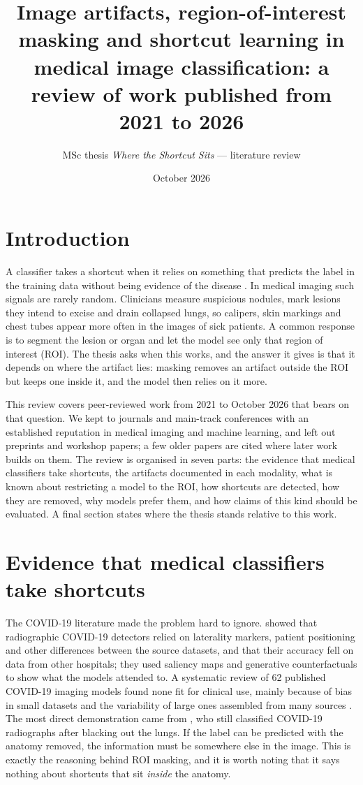 \documentclass[11pt,a4paper]{article}
\title{Image artifacts, region-of-interest masking and shortcut learning in medical image classification: a review
of work published from 2021 to 2026}
\author{MSc thesis \emph{Where the Shortcut Sits} --- literature review}
\date{October 2026}
\begin{document}
\maketitle

\section{Introduction}
A classifier takes a shortcut when it relies on something that predicts the label in the training data without being
evidence of the disease \citep{geirhos2020shortcut}. In medical imaging such signals are rarely random. Clinicians
measure suspicious nodules, mark lesions they intend to excise and drain collapsed lungs, so calipers, skin markings
and chest tubes appear more often in the images of sick patients. A common response is to segment the lesion or organ
and let the model see only that region of interest (ROI). The thesis asks when this works, and the answer it gives is
that it depends on where the artifact lies: masking removes an artifact outside the ROI but keeps one inside it, and the
model then relies on it more.

This review covers peer-reviewed work from 2021 to October 2026 that bears on that question. We kept to journals and
main-track conferences with an established reputation in medical imaging and machine learning, and left out preprints
and workshop papers; a few older papers are cited where later work builds on them. The review is organised in seven
parts: the evidence that medical classifiers take shortcuts, the artifacts documented in each modality, what is known
about restricting a model to the ROI, how shortcuts are detected, how they are removed, why models prefer them, and how
claims of this kind should be evaluated. A final section states where the thesis stands relative to this work.

\section{Evidence that medical classifiers take shortcuts}
The COVID-19 literature made the problem hard to ignore. \citet{degrave2021ai} showed that radiographic COVID-19
detectors relied on laterality markers, patient positioning and other differences between the source datasets, and
that their accuracy fell on data from other hospitals; they used saliency maps and generative counterfactuals to show
what the models attended to. A systematic review of 62 published COVID-19 imaging models found none fit for clinical
use, mainly because of bias in small datasets and the variability of large ones assembled from many sources
\citep{roberts2021pitfalls}. The most direct demonstration came from \citet{maguolo2021critic}, who still classified
COVID-19 radiographs after blacking out the lungs. If the label can be predicted with the anatomy removed, the
information must be somewhere else in the image. This is exactly the reasoning behind ROI masking, and it is worth
noting that it says nothing about shortcuts that sit \emph{inside} the anatomy.
\end{document}

